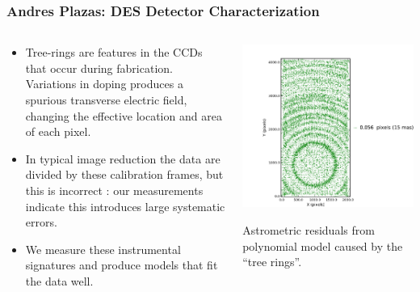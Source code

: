 \documentclass{beamer}
\begin{document}
{
    \frametitle{Andres Plazas: DES Detector Characterization}

    \fontsize{9}{0.7\baselineskip}
    \begin{columns}
        \begin{column}{0.4\textwidth}
            \begin{itemize}

                \item Tree-rings are features in the CCDs that occur during
                    fabrication.  Variations in doping produces a spurious
                    transverse electric field, changing the effective location
                    and area of each pixel.

                \item In typical image reduction the data are divided by these
                    calibration frames, but this is incorrect : our
                    measurements indicate this introduces large systematic
                    errors.

                \item We measure these instrumental signatures and produce
                    models that fit the data well.

            \end{itemize}
        \end{column}
        \begin{column}{0.6\textwidth}
            \includegraphics[width=\textwidth]{N22_astrometric_single-crop.pdf}
            \newline

            {\tiny Astrometric residuals from polynomial model caused by
            the ``tree rings''. \par}


        \end{column}
    \end{columns}


}
\end{document}
